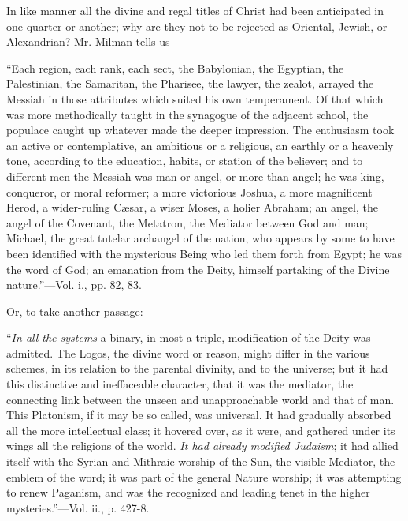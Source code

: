 In like manner all the divine and regal titles of
Christ had been anticipated in one quarter or another; why are they
not to be rejected as Oriental, Jewish, or Alexandrian? Mr. Milman
tells us—

``Each
region, each rank, each sect, the Babylonian, the Egyptian, the
Palestinian, the Samaritan, the Pharisee, the lawyer, the zealot,
arrayed the Messiah in those attributes which suited his own
temperament. Of that which was more methodically taught in the
synagogue of the adjacent school, the populace caught up whatever made
the deeper impression. The enthusiasm took an active or contemplative,
an ambitious or a religious, an earthly or a heavenly tone, according
to the education, habits, or station of the believer; and to different
men the Messiah was man or angel, or more than angel; he was king,
conqueror, or moral reformer; a more victorious Joshua, a more
magnificent Herod, a wider-ruling Cæsar, a wiser Moses, a holier
Abraham; an angel, the angel of the Covenant, the Metatron, the
Mediator between God and man; Michael, the great tutelar archangel of
the nation, who appears by some to have been identified with the
mysterious Being who led them forth from Egypt; he was the word of
God; an emanation from the Deity, himself partaking of the Divine
nature.''—Vol. i., pp. 82, 83.

Or, to take another passage:

``\emph{In
all the systems} a binary, in most a triple, modification of the
Deity was admitted. The Logos, the divine word or reason, might differ
in the various schemes, in its relation to the parental divinity, and
to the universe; but it had this distinctive and ineffaceable
character, that it was the mediator, the connecting link between the
unseen and unapproachable world and that of man. This Platonism, if it
may be so called, was universal. It had gradually absorbed all the
more intellectual class; it hovered over, as it were, and gathered under its wings all the religions of the world. \emph{It
had already modified Judaism}; it had allied itself with the Syrian
and Mithraic worship of the Sun, the visible Mediator, the emblem of
the word; it was part of the general Nature worship; it was attempting
to renew Paganism, and was the recognized and leading tenet in the
higher mysteries.''—Vol. ii., p. 427-8.

